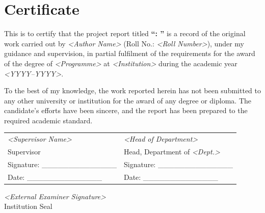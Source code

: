 \chapter*{Certificate}

\vspace{1cm}

This is to certify that the project report titled
\textbf{``\projname: \projtag''} is a record of the original work carried
out by \emph{\textless Author Name\textgreater} (Roll No.: \emph{\textless Roll
Number\textgreater}), under my guidance and supervision, in partial
fulfilment of the requirements for the award of the degree of
\emph{\textless Programme\textgreater} at \emph{\textless Institution\textgreater}
during the academic year \emph{\textless YYYY--YYYY\textgreater}.

To the best of my knowledge, the work reported herein has not been
submitted to any other university or institution for the award of any
degree or diploma. The candidate's efforts have been sincere, and the
report has been prepared to the required academic standard.

\vspace{3cm}
\noindent
\begin{tabular}{@{}p{7.5cm}p{7.5cm}@{}}
\emph{\textless Supervisor Name\textgreater} & \emph{\textless Head of Department\textgreater} \\
Supervisor & Head, Department of \emph{\textless Dept.\textgreater} \\[0.6cm]
Signature: \_\_\_\_\_\_\_\_\_\_\_\_\_\_ & Signature: \_\_\_\_\_\_\_\_\_\_\_\_\_\_ \\
Date: \_\_\_\_\_\_\_\_\_\_\_\_\_\_ & Date: \_\_\_\_\_\_\_\_\_\_\_\_\_\_ \\
\end{tabular}

\vfill
\begin{center}
\emph{\textless External Examiner Signature\textgreater} \\
\vspace{1cm}
Institution Seal
\end{center}
\clearpage
